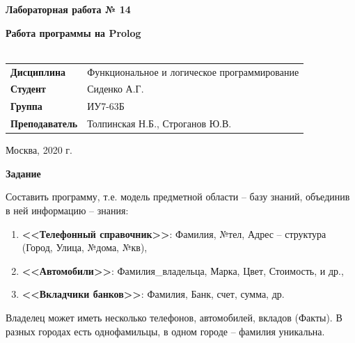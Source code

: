 \documentclass[a4paper,14pt]{extreport} %
\begin{document}
\begin{titlepage}
    \vspace{4cm}

    \begin{center}
        \textbf{Лабораторная работа № 14} \\ 
        \hfill
        
        \textbf{Работа программы на Prolog} \\
        \vspace{0.5cm}
        \textbf{} \\
    \end{center}

    \vspace{4cm}

    \begin{flushleft}
        \begin{tabular}{ll}
            \textbf{Дисциплина} & Функциональное и логическое программирование \\
            \textbf{Студент} & Сиденко А.Г. \\
            \textbf{Группа} & ИУ7-63Б \\
            \textbf{Преподаватель} & Толпинская Н.Б., Строганов Ю.В.  \\
        \end{tabular}
    \end{flushleft}

    \vspace{4cm}

   \begin{center}
        Москва, 2020 г.
    \end{center}

\end{titlepage}

\textbf{Задание}

Составить программу, т.е. модель предметной области – базу знаний, объединив в ней информацию – знания:

\begin{enumerate}
\item \textbf{<<Телефонный справочник>>}: Фамилия, №тел, Адрес – структура (Город, Улица, №дома, №кв),
\item \textbf{<<Автомобили>>}: Фамилия\_владельца, Марка, Цвет, Стоимость, и др.,
\item \textbf{<<Вкладчики банков>>}: Фамилия, Банк, счет, сумма, др.
\end{enumerate}

Владелец может иметь несколько телефонов, автомобилей, вкладов (Факты). В разных городах есть однофамильцы, в одном городе -- фамилия уникальна.
\end{document}
